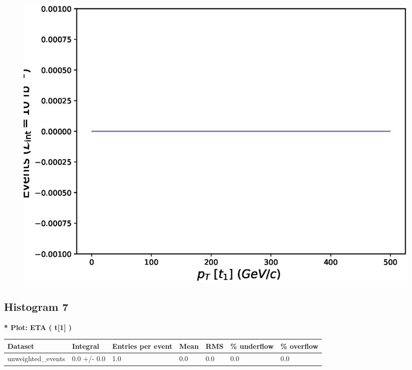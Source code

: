 \documentclass[a4paper, 10pt]{article}
\begin{document}
\begin{figure}[H]
  \begin{center}
    \includegraphics[scale=0.45]{selection_5.eps}\\
\caption{   }
  \end{center}
\end{figure}
      \newpage
\subsection{ Histogram 7}

\textbf{* Plot: ETA ( t[1] ) }\\
   \begin{table}[H]
  \begin{center}
    \begin{tabular}{|m{23.0mm}|m{23.0mm}|m{18.0mm}|m{19.0mm}|m{19.0mm}|m{19.0mm}|m{19.0mm}|}
      \hline
      {\cellcolor{yellow}         Dataset}& {\cellcolor{yellow}         Integral}& {\cellcolor{yellow}         Entries per event}& {\cellcolor{yellow}         Mean}& {\cellcolor{yellow}         RMS}& {\cellcolor{yellow}         \% underflow}& {\cellcolor{yellow}         \% overflow}\\
      \hline
      {\cellcolor{white}         unweighted\_events}& {\cellcolor{white}         0.0 +/\-- 0.0}& {\cellcolor{white}         1.0}& {\cellcolor{white}         0.0}& {\cellcolor{white}         0.0}& {\cellcolor{green}         0.0}& {\cellcolor{green}         0.0}\\
\hline
    \end{tabular}
  \end{center}
\end{table}
\end{document}
